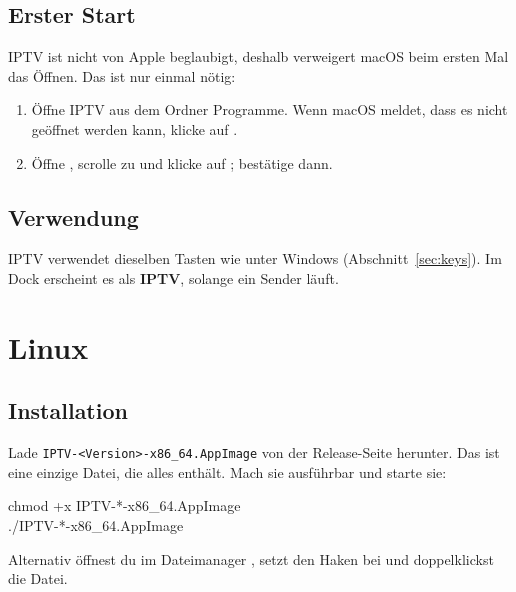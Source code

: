 \subsection{Erster Start}
IPTV ist nicht von Apple beglaubigt, deshalb verweigert macOS beim ersten
Mal das Öffnen. Das ist nur einmal nötig:
\begin{enumerate}
  \item Öffne IPTV aus dem Ordner Programme. Wenn macOS meldet, dass es
        nicht geöffnet werden kann, klicke auf .
  \item Öffne , scrolle zu  und klicke
        auf ; bestätige dann.
\end{enumerate}

\subsection{Verwendung}
IPTV verwendet dieselben Tasten wie unter Windows
(Abschnitt~\ref{sec:keys}). Im Dock erscheint es als \textbf{IPTV}, solange
ein Sender läuft.


\section{Linux}

\subsection{Installation}
Lade \texttt{IPTV-\textless Version\textgreater-x86\_64.AppImage} von der
Release-Seite herunter. Das ist eine einzige Datei, die alles enthält. Mach
sie ausführbar und starte sie:
\begin{center}
\begin{minipage}{0.8\linewidth}
\small\ttfamily chmod +x IPTV-*-x86\_64.AppImage\\
./IPTV-*-x86\_64.AppImage
\end{minipage}
\end{center}
Alternativ öffnest du im Dateimanager , setzt den Haken bei  und doppelklickst die Datei.

